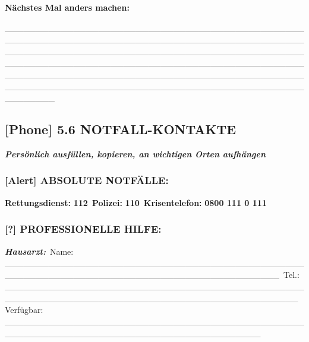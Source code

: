 \textbf{Nächstes Mal anders machen:}

\_\_\_\_\_\_\_\_\_\_\_\_\_\_\_\_\_\_\_\_\_\_\_\_\_\_\_\_\_\_\_\_\_\_\_\_\_\_\_\_\_\_\_\_\_\_\_\_\_\_\_\_\_\_\_\_\_\_\_\_\_\_\_\_\_\_\_\_\_\_\_\_\_\_\_\_\_\_\_\_\_\_\_\_\_\_\_\_\_\_\_\_\_\_\_\_\_\_\_\_\_\_\_\_\_\_\_\_\_\_\_\_\_\_\_\_\_\_\_\_\_\_\_\_\_\_\_\_\_\_\_\_\_\_\_\_\_\_\_\_\_\_\_\_\_\_\_\_\_\_\_\_\_\_\_\_\_\_\_\_\_\_\_\_\_\_\_\_\_\_\_\_\_\_\_\_\_\_\_\_\_\_\_\_\_\_\_\_\_\_\_\_\_\_\_\_\_\_\_\_\_\_\_\_\_\_\_\_\_\_\_\_\_\_\_\_\_\_\_\_\_\_\_\_\_\_\_\_\_\_\_\_\_\_\_\_\_\_\_\_\_\_\_\_\_\_\_\_\_\_\_\_\_\_\_\_\_\_\_\_\_\_\_\_\_\_\_\_\_\_\_\_\_\_\_\_\_\_\_\_\_\_\_\_\_\_\_\_\_\_\_\_\_\_\_\_

\hypertarget{notfall-kontakte}{%
\subsection{\texorpdfstring{[Phone] \textbf{5.6 NOTFALL-KONTAKTE}}{[Phone] 5.6 NOTFALL-KONTAKTE}}\label{notfall-kontakte}}

\emph{\textbf{Persönlich ausfüllen, kopieren, an wichtigen Orten aufhängen}}

\hypertarget{absolute-notfuxe4lle}{%
\subsubsection{\texorpdfstring{\textbf{[Alert] ABSOLUTE NOTFÄLLE:}}{[Alert] ABSOLUTE NOTFÄLLE:}}\label{absolute-notfuxe4lle}}

\textbf{Rettungsdienst:} \textbf{112}\
\textbf{Polizei:} \textbf{110}\
\textbf{Krisentelefon:} \textbf{0800 111 0 111}

\hypertarget{professionelle-hilfe}{%
\subsubsection{\texorpdfstring{\textbf{[?] PROFESSIONELLE HILFE:}}{[?] PROFESSIONELLE HILFE:}}\label{professionelle-hilfe}}

\emph{\textbf{Hausarzt:}}\
Name: \_\_\_\_\_\_\_\_\_\_\_\_\_\_\_\_\_\_\_\_\_\_\_\_\_\_\_\_\_\_\_\_\_\_\_\_\_\_\_\_\_\_\_\_\_\_\_\_\_\_\_\_\_\_\_\_\_\_\_\_\_\_\_\_\_\_\_\_\_\_\_\_\_\_\_\_\_\_\_\_\_\_\_\_\_\_\_\_\_\_\_\_\
Tel.: \_\_\_\_\_\_\_\_\_\_\_\_\_\_\_\_\_\_\_\_\_\_\_\_\_\_\_\_\_\_\_\_\_\_\_\_\_\_\_\_\_\_\_\_\_\_\_\_\_\_\_\_\_\_\_\_\_\_\_\_\_\_\_\_\_\_\_\_\_\_\_\_\_\_\_\_\_\_\_\_\_\_\_\_\_\_\_\_\_\_\_\_\_\_\_\
Verfügbar: \_\_\_\_\_\_\_\_\_\_\_\_\_\_\_\_\_\_\_\_\_\_\_\_\_\_\_\_\_\_\_\_\_\_\_\_\_\_\_\_\_\_\_\_\_\_\_\_\_\_\_\_\_\_\_\_\_\_\_\_\_\_\_\_\_\_\_\_\_\_\_\_\_\_\_\_\_\_\_\_\_\_\_\_\_\_\_\_\_

